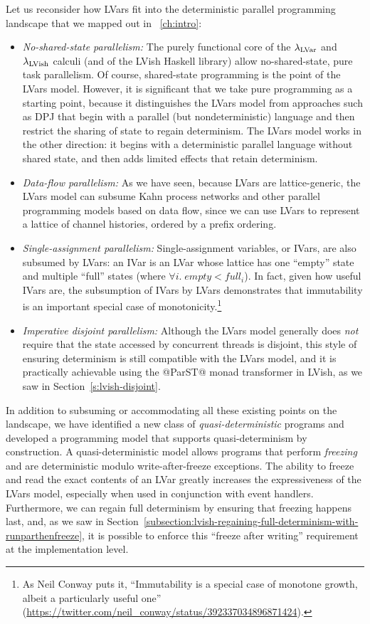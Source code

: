 Let us reconsider how LVars fit into the deterministic parallel
programming landscape that we mapped out in ~\ref{ch:intro}:
\begin{itemize}
  \item \emph{No-shared-state parallelism:} The purely functional core
    of the $\lambda_{\textrm{LVar}}$ and $\lambda_{\textrm{LVish}}$ calculi (and of the LVish
    Haskell library) allow no-shared-state, pure task parallelism.  Of
    course, shared-state programming is the point of the LVars model.
    However, it is significant that we take pure programming as a
    starting point, because it distinguishes the LVars model from
    approaches such as DPJ that begin with a
    parallel (but nondeterministic) language and then restrict the
    sharing of state to regain determinism.  The LVars model works in
    the other direction: it begins with a deterministic parallel
    language without shared state, and then adds limited effects that
    retain determinism.
  \item \emph{Data-flow parallelism:} As we have seen, because LVars
    are lattice-generic, the LVars model can subsume Kahn process
    networks and other parallel programming models based on data flow,
    since we can use LVars to represent a lattice of channel
    histories, ordered by a prefix ordering.
  \item \emph{Single-assignment parallelism:} Single-assignment
    variables, or IVars, are also subsumed by LVars: an IVar is an
    LVar whose lattice has one ``empty'' state and multiple ``full''
    states (where $\forall{i}.\; \mathit{empty} < \mathit{full_i}$).
    In fact, given how useful IVars are, the subsumption of IVars by
    LVars demonstrates that immutability is an important special case
    of monotonicity.\footnote{As Neil Conway puts it, ``Immutability
      is a special case of monotone growth, albeit a particularly
      useful one''
      (\url{https://twitter.com/neil_conway/status/392337034896871424}).}
  \item \emph{Imperative disjoint parallelism:} Although the LVars
    model generally does \emph{not} require that the state accessed by
    concurrent threads is disjoint, this style of ensuring determinism
    is still compatible with the LVars model, and it is practically
    achievable using the @ParST@ monad transformer in LVish, as we saw
    in Section~\ref{s:lvish-disjoint}.
\end{itemize}
In addition to subsuming or accommodating all these existing points on
the landscape, we have identified a new class of
\emph{quasi-deterministic} programs and developed a programming model
that supports quasi-determinism by construction.  A
quasi-deterministic model allows programs that perform \emph{freezing}
and are deterministic modulo write-after-freeze exceptions.  The
ability to freeze and read the exact contents of an LVar greatly
increases the expressiveness of the LVars model, especially when used
in conjunction with event handlers.  Furthermore, we can regain full
determinism by ensuring that freezing happens last, and, as we saw in
Section~\ref{subsection:lvish-regaining-full-determinism-with-runparthenfreeze},
it is possible to enforce this ``freeze after writing'' requirement at
the implementation level.


